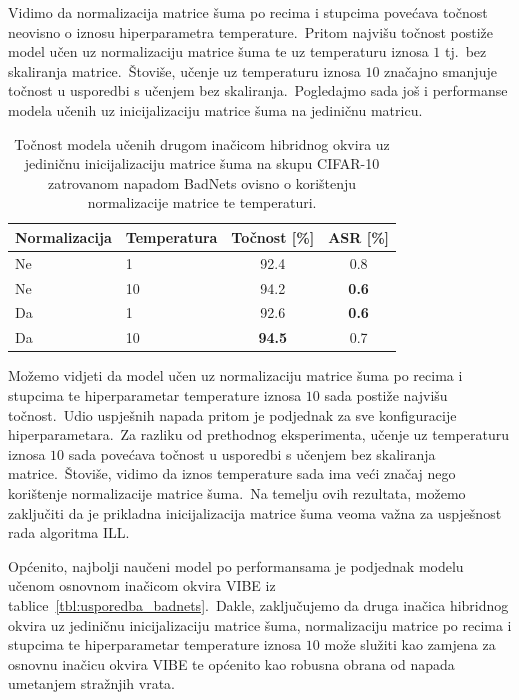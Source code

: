 \documentclass[diplomskirad]{fer}
\begin{document}
\pagebreak

Vidimo da normalizacija matrice šuma po recima i stupcima povećava točnost neovisno o iznosu hiperparametra temperature.\ 
Pritom najvišu točnost postiže model učen uz normalizaciju matrice šuma te uz temperaturu iznosa $1$ tj.\ bez skaliranja matrice.\ 
Štoviše, učenje uz temperaturu iznosa $10$ značajno smanjuje točnost u usporedbi s učenjem bez skaliranja.\ 
Pogledajmo sada još i performanse modela učenih uz inicijalizaciju matrice šuma na jediničnu matricu.\ 

\begin{table}[htb]
  \caption{Točnost modela učenih drugom inačicom hibridnog okvira uz jediničnu inicijalizaciju matrice šuma na skupu CIFAR-10 zatrovanom napadom BadNets ovisno o korištenju normalizacije matrice te temperaturi.}
  \label{tbl:trovanje_hibrid2_jedinicna_init}
  \centering
  \begin{tabular}{ll||cc}
  Normalizacija & Temperatura & Točnost [\%] & ASR [\%]\\ \hline \hline
  Ne & 1 & 92.4 & 0.8 \\
  Ne & 10 & 94.2 & \textbf{0.6} \\ \hline
  Da & 1 & 92.6 & \textbf{0.6} \\ 
  Da & 10 & \textbf{94.5} & 0.7 \\ 
  \end{tabular}
\end{table}

Možemo vidjeti da model učen uz normalizaciju matrice šuma po recima i stupcima te hiperparametar temperature iznosa $10$ sada postiže najvišu točnost.\ Udio uspješnih napada pritom je podjednak za sve konfiguracije hiperparametara.\ 
Za razliku od prethodnog eksperimenta, učenje uz temperaturu iznosa $10$ sada povećava točnost u usporedbi s učenjem bez skaliranja matrice.\ Štoviše, vidimo da iznos temperature sada ima veći značaj nego korištenje normalizacije matrice šuma.\ 
Na temelju ovih rezultata, možemo zaključiti da je prikladna inicijalizacija matrice šuma veoma važna za uspješnost rada algoritma ILL.\ 

Općenito, najbolji naučeni model po performansama je podjednak modelu učenom osnovnom inačicom okvira VIBE iz tablice~\ref{tbl:usporedba_badnets}.\ 
Dakle, zaključujemo da druga inačica hibridnog okvira uz jediničnu inicijalizaciju matrice šuma, normalizaciju matrice po recima i stupcima te hiperparametar temperature iznosa $10$ može služiti kao zamjena za osnovnu inačicu okvira VIBE te općenito kao robusna obrana od napada umetanjem stražnjih vrata.\
\end{document}

